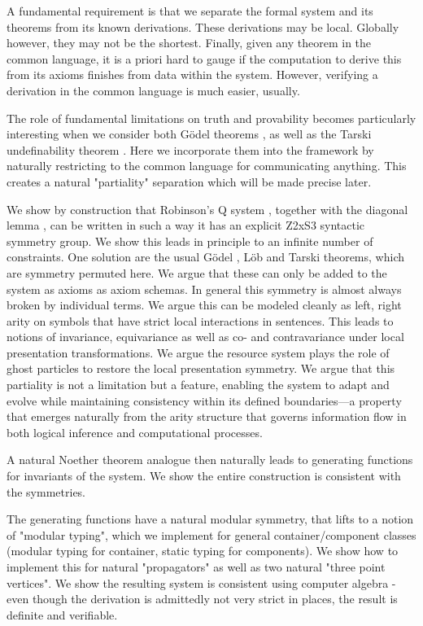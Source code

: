 A fundamental requirement is that we separate the formal system and its theorems from its known derivations. These derivations may be local. Globally however, they may not be the shortest. Finally, given any theorem in the common language, it is a priori hard to gauge if the computation to derive this from its axioms finishes from data within the system. However, verifying a derivation in the common language is much easier, usually.

The role of fundamental limitations on truth and provability becomes particularly interesting when we consider both Gödel theorems \cite{godel1931}, as well as the Tarski undefinability theorem \cite{tarski1936}. Here we incorporate them into the framework by naturally restricting to the common language for communicating anything. This creates a natural "partiality" separation which will be made precise later. 

We show by construction that Robinson's Q system \cite{robinson1950}, together with the diagonal lemma \cite{kleene1952}, can be written in such a way it has an explicit Z2xS3 syntactic symmetry group. We show this leads in principle to an infinite number of constraints. One solution are the usual Gödel \cite{godel1931}, Löb \cite{lob1955} and Tarski \cite{tarski1936} theorems, which are symmetry permuted here. We argue that these can only be added to the system as axioms as axiom schemas. In general this symmetry is almost always broken by individual terms. We argue this can be modeled cleanly as left, right arity on symbols that have strict local interactions in sentences. This leads to notions of invariance, equivariance as well as co- and contravariance under local presentation transformations. We argue the resource system plays the role of ghost particles to restore the local presentation symmetry. We argue that this partiality is not a limitation but a feature, enabling the system to adapt and evolve while maintaining consistency within its defined boundaries—a property that emerges naturally from the arity structure that governs information flow in both logical inference and computational processes.

A natural Noether theorem analogue then naturally leads to generating functions for invariants of the system. We show the entire construction is consistent with the symmetries. 

The generating functions have a natural modular symmetry, that lifts to a notion of "modular typing", which we implement for general container/component classes (modular typing for container, static typing for components). We show how to implement this for natural "propagators" as well as two natural "three point vertices". We show the resulting system is consistent using computer algebra -  even though the derivation is admittedly not very strict in places, the result is definite and verifiable. 

